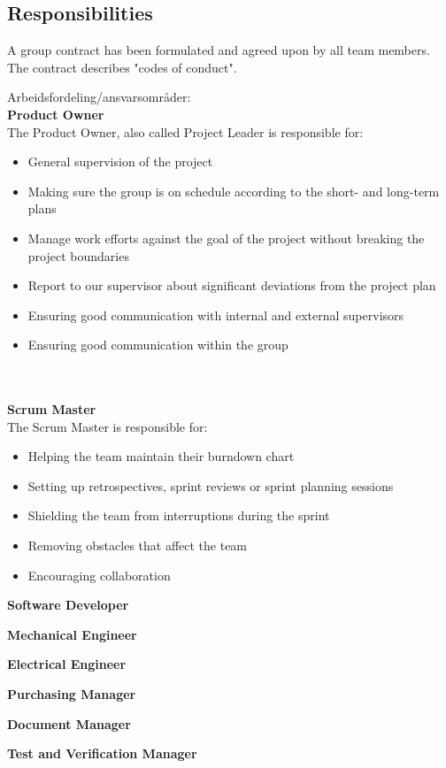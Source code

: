 \subsection{Responsibilities}

A group contract has been formulated and agreed upon by all team members. The contract describes "codes of conduct". 

Arbeidsfordeling/ansvarsområder:\\

\textbf{Product Owner}\\
The Product Owner, also called Project Leader is responsible for: 
\begin{itemize}
  \item General supervision of the project
  \item Making sure the group is on schedule according to the short- and long-term plans
  \item Manage work efforts against the goal of the project without breaking the project boundaries 
  \item Report to our supervisor about significant deviations from the project plan
  \item Ensuring good communication with internal and external supervisors
  \item Ensuring good communication within the group
\end{itemize}\\
\\
\textbf{Scrum Master}\\
The Scrum Master is responsible for: 
\begin{itemize}
  \item Helping the team maintain their burndown chart
  \item Setting up retrospectives, sprint reviews or sprint planning sessions
  \item Shielding the team from interruptions during the sprint
  \item Removing obstacles that affect the team
  \item Encouraging collaboration
\end{itemize}

\textbf{Software Developer}

\textbf{Mechanical Engineer}

\textbf{Electrical Engineer}

\textbf{Purchasing Manager}

\textbf{Document Manager}

\textbf{Test and Verification Manager}
